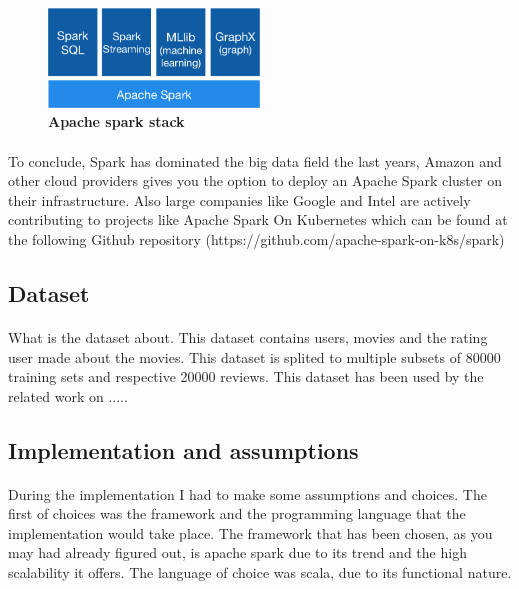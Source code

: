 \begin{figure}[ht]
  \centering
    \includegraphics[width=0.5\textwidth]{images/spark-stack.png}
    \caption{\bfseries Apache spark stack \cite{ApacheSpark:1}}
   \label{apacheSparkStack}
\end{figure}

\paragraph{} To conclude, Spark has dominated the big data field the last years, Amazon and other cloud providers gives you the option to deploy an Apache Spark cluster on their infrastructure. Also large companies like Google and Intel are actively contributing to projects like Apache Spark On Kubernetes which can be found at the following Github repository (https://github.com/apache-spark-on-k8s/spark)

\subsection{Dataset}
\paragraph{}What is the dataset about. This dataset contains users, movies and the rating user made about the movies.
This dataset is splited to multiple subsets of 80000 training sets and respective 20000 reviews.
This dataset has been used by the related work on .....
\cite{MovieLens:3}

\subsection{Implementation and assumptions}
\paragraph{}During the implementation I had to make some assumptions and choices. The first of choices was the framework and the programming language that the implementation would take place. The framework that has been chosen, as you may had already figured out, is apache spark due to its trend and the high scalability it offers. The language of choice was scala, due to its functional nature.
